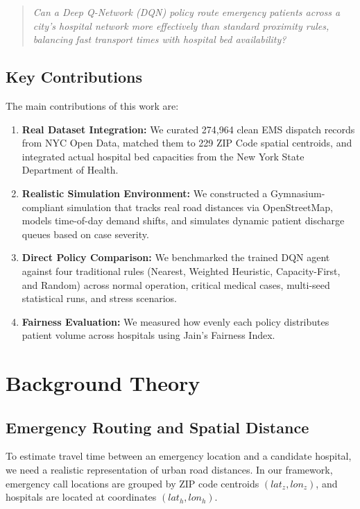 \documentclass[11pt,a4paper]{article}
\begin{document}
\begin{quote}
\textit{Can a Deep Q-Network (DQN) policy route emergency patients across a city's hospital network more effectively than standard proximity rules, balancing fast transport times with hospital bed availability?}
\end{quote}

\subsection{Key Contributions}
The main contributions of this work are:
\begin{enumerate}[leftmargin=*]
    \item \textbf{Real Dataset Integration:} We curated 274,964 clean EMS dispatch records from NYC Open Data, matched them to 229 ZIP Code spatial centroids, and integrated actual hospital bed capacities from the New York State Department of Health.
    \item \textbf{Realistic Simulation Environment:} We constructed a Gymnasium-compliant simulation that tracks real road distances via OpenStreetMap, models time-of-day demand shifts, and simulates dynamic patient discharge queues based on case severity.
    \item \textbf{Direct Policy Comparison:} We benchmarked the trained DQN agent against four traditional rules (Nearest, Weighted Heuristic, Capacity-First, and Random) across normal operation, critical medical cases, multi-seed statistical runs, and stress scenarios.
    \item \textbf{Fairness Evaluation:} We measured how evenly each policy distributes patient volume across hospitals using Jain's Fairness Index.
\end{enumerate}

\section{Background Theory}
\label{sec:background}

\subsection{Emergency Routing and Spatial Distance}
To estimate travel time between an emergency location and a candidate hospital, we need a realistic representation of urban road distances. In our framework, emergency call locations are grouped by ZIP code centroids $(lat_z, lon_z)$, and hospitals are located at coordinates $(lat_h, lon_h)$. 
\end{document}
